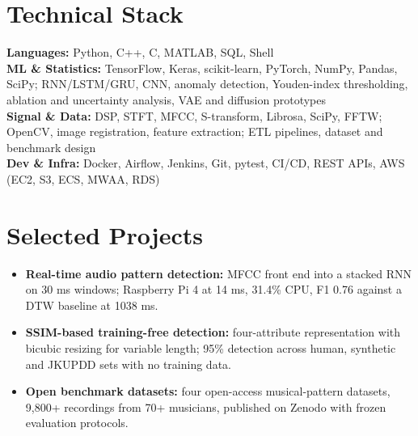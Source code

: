 \documentclass[11pt]{article}
\begin{document}
\section*{Technical Stack}

\textbf{Languages:} Python, C++, C, MATLAB, SQL, Shell\\
\textbf{ML \& Statistics:} TensorFlow, Keras, scikit-learn, PyTorch, NumPy, Pandas, SciPy; RNN/LSTM/GRU, CNN, anomaly detection, Youden-index thresholding, ablation and uncertainty analysis, VAE and diffusion prototypes\\
\textbf{Signal \& Data:} DSP, STFT, MFCC, S-transform, Librosa, SciPy, FFTW; OpenCV, image registration, feature extraction; ETL pipelines, dataset and benchmark design\\
\textbf{Dev \& Infra:} Docker, Airflow, Jenkins, Git, pytest, CI/CD, REST APIs, AWS (EC2, S3, ECS, MWAA, RDS)


\section*{Selected Projects \footnotesize {}}
\begin{itemize}[leftmargin=1.2em, itemsep=-0.25em]
    \item \textbf{Real-time audio pattern detection:} MFCC front end into a stacked RNN on 30 ms windows; Raspberry Pi 4 at 14 ms, 31.4\% CPU, F1 0.76 against a DTW baseline at 1038 ms.
    \item \textbf{SSIM-based training-free detection:} four-attribute representation with bicubic resizing for variable length; 95\% detection across human, synthetic and JKUPDD sets with no training data.
    \item \textbf{Open benchmark datasets:} four open-access musical-pattern datasets, 9,800+ recordings from 70+ musicians, published on Zenodo with frozen evaluation protocols.
\end{itemize}
\end{document}

